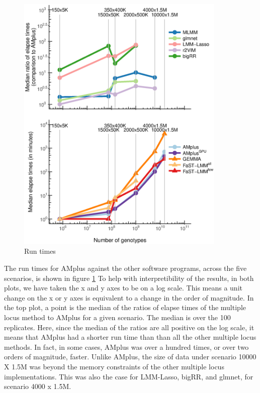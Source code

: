 \documentclass{nature}
\begin{document}
\begin{figure}
\label{fig_runtimes}
\caption{Run times}
\includegraphics[width=10cm]{time}
\end{figure}


The run times for AMplus against the other software programs, across the five scenarios, is shown in figure \ref{fig_runtimes} To help with interpretibility of the results, in both plots, we have taken the x and y axes to be on a log scale. This means a unit change on the x or y axes is equivalent to a change in the order of magnitude. 
In the top plot, a point is the median of the ratios of elapse times of the multiple locus method to AMplus for a given scenario. The median is over the 100 replicates. Here, since the median of the ratios are all positive on the log scale, it means that AMplus had a shorter run time than than all the other multiple locus methods. In fact, in some cases, AMplus was over a hundred times, or over two orders of magnitude, faster. Unlike AMplus, the size of data under scenario 10000 X 1.5M was beyond the memory constraints of the other multiple locus implementations. This was also the case for LMM-Lasso, bigRR, and glmnet, for scenario 4000 x 1.5M.
\end{document}
